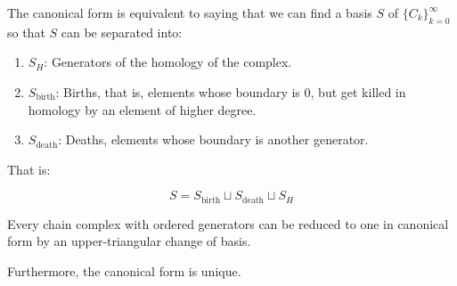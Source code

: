 \begin{remark}
The canonical form is equivalent to saying that we can find a basis $S$ 
of $\{C_k\}_{k=0}^{\infty}$ so that $S$
can be separated into: 
\begin{enumerate}
\item $S_H$: Generators of the homology of the complex.

\item $S_{\text{birth}}$: Births, that is, elements whose boundary is $0$, but get killed in homology by an element of higher degree.

\item $S_{\text{death}}$: Deaths, elements whose boundary is another generator. 
\end{enumerate}

That is:

$$
S=S_{\text{birth}}\sqcup
S_{\text{death}}\sqcup
 S_H
$$ 
\end{remark}

\begin{theorem}
Every chain complex with ordered generators can be reduced to 
one in canonical form by an upper-triangular change of basis.

Furthermore, the canonical form is unique.
\end{theorem}

